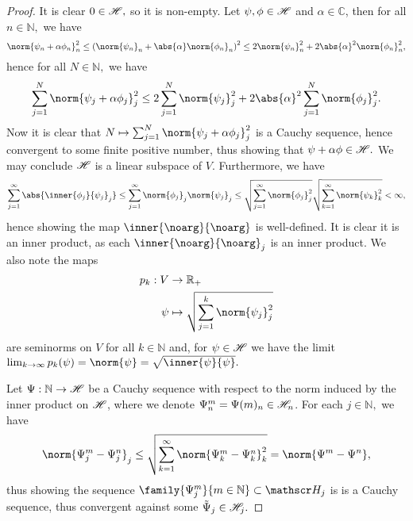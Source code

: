 \begin{proof}
    It is clear \(0 \in \mathscr{H},\) so it is non-empty. Let \(\psi, \phi \in \mathscr{H}\) and \(\alpha \in \mathbb{C}\), then for all \(n \in \mathbb{N},\) we have
    \begin{equation*}
        \norm{\psi_n + \alpha \phi_n}_n^2 \leq \left(\norm{\psi_n}_n + \abs{\alpha} \norm{\phi_n}_n\right)^2 \leq 2\norm{\psi_n}_n^2 + 2 \abs{\alpha}^2\norm{\phi_n}_n^2,
    \end{equation*}
    hence for all \(N \in \mathbb{N},\) we have
    \begin{equation*}
        \sum_{j = 1}^N{\norm{\psi_j + \alpha \phi_j}_j^2}\leq 2\sum_{j = 1}^N{\norm{\psi_j}_j^2} + 2 \abs{\alpha}^2 \sum_{j = 1}^N{\norm{\phi_j}_j^2}.
    \end{equation*}
    Now it is clear that \(N \mapsto \sum_{j = 1}^N \norm{\psi_j + \alpha \phi_j}_j^2\) is a Cauchy sequence, hence convergent to some finite positive number, thus showing that \(\psi + \alpha \phi \in \mathscr{H}.\) We may conclude \(\mathscr{H}\) is a linear subspace of \(V\). Furthermore, we have
    \begin{equation*}
        \sum_{j = 1}^\infty \abs{\inner{\phi_j}{\psi_j}_j} \leq \sum_{j = 1}^\infty \norm{\phi_j}_j \norm{\psi_j}_j \leq \sqrt{\sum_{j = 1}^\infty{\norm{\phi_j}_j^2}}\sqrt{\sum_{k = 1}^\infty{\norm{\psi_k}_k^2}}< \infty,
    \end{equation*}
    hence showing the map \(\inner{\noarg}{\noarg}\) is well-defined. It is clear it is an inner product, as each \(\inner{\noarg}{\noarg}_j\) is an inner product. We also note the maps
    \begin{align*}
        p_k : V &\to \mathbb{R}_+\\
                  \psi &\mapsto \sqrt{\sum_{j = 1}^k{\norm{\psi_j}_j^2}}
    \end{align*}
    are seminorms on \(V\) for all \(k \in \mathbb{N}\) and, for \(\psi \in \mathscr{H}\) we have the limit \(\lim_{k \to \infty}{p_k(\psi)} = \norm{\psi} = \sqrt{\inner{\psi}{\psi}}.\)

    Let \(\Psi : \mathbb{N} \to \mathscr{H}\) be a Cauchy sequence with respect to the norm induced by the inner product on \(\mathscr{H}\), where we denote \(\Psi^m_n = \Psi(m)_n \in \mathscr{H}_n\). For each \(j \in \mathbb{N},\) we have
    \begin{equation*}
    \norm{\Psi^m_j - \Psi^n_j}_j \leq \sqrt{\sum_{k = 1}^\infty{\norm{\Psi^m_k - \Psi^n_k}_k^2}} =  \norm{\Psi^m - \Psi^n},
    \end{equation*}
    thus showing the sequence \(\family{\Psi^m_j}{m \in \mathbb{N}} \subset \hilbert_j\) is is a Cauchy sequence, thus convergent against some \(\tilde{\Psi}_j \in \mathscr{H}_j.\) 


\end{proof}
